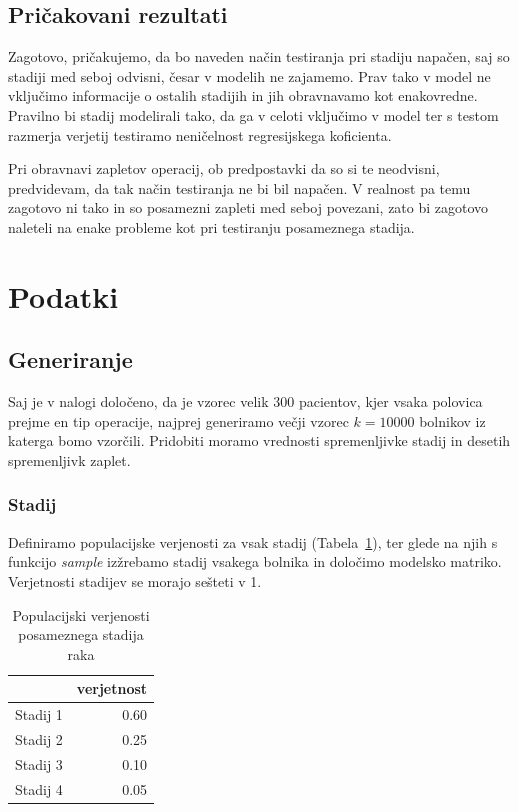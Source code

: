 \documentclass[letterpaper,11pt]{article}
\begin{document}
\subsection{Pričakovani rezultati}
Zagotovo, pričakujemo, da bo naveden način testiranja pri stadiju napačen, saj so stadiji med seboj odvisni, česar v modelih ne zajamemo. Prav tako v model ne vključimo informacije o ostalih stadijih in jih obravnavamo kot enakovredne. Pravilno bi stadij modelirali tako,  da ga v celoti vključimo v model ter s testom razmerja verjetij testiramo neničelnost regresijskega koficienta.

\noindent Pri obravnavi zapletov operacij, ob predpostavki da so si te neodvisni, predvidevam, da tak način testiranja ne bi bil napačen. V realnost pa temu zagotovo ni tako in so posamezni zapleti med seboj povezani, zato bi zagotovo naleteli na enake probleme kot pri testiranju posameznega stadija.

\section{Podatki}
\subsection{Generiranje}
Saj je v nalogi določeno, da je vzorec velik 300 pacientov, kjer vsaka polovica prejme en tip operacije, najprej generiramo večji vzorec $k=10000$ bolnikov iz katerga bomo vzorčili. Pridobiti moramo vrednosti spremenljivke stadij in desetih spremenljivk zaplet.

\subsubsection{Stadij}
Definiramo populacijske verjenosti za vsak stadij (Tabela~\ref{table:1}), ter glede na njih s funkcijo \emph{sample} izžrebamo stadij vsakega bolnika in določimo modelsko matriko. Verjetnosti stadijev se morajo sešteti v 1.

\begin{table}[ht]
\centering
\begin{tabular}{rr}
  \hline
 & verjetnost \\ 
  \hline
Stadij 1 & 0.60 \\ 
  Stadij 2 & 0.25 \\ 
  Stadij 3 & 0.10 \\ 
  Stadij 4 & 0.05 \\ 
   \hline
\end{tabular}
\caption{Populacijski verjenosti posameznega stadija raka} 
\label{table:1}
\end{table}
\end{document}
